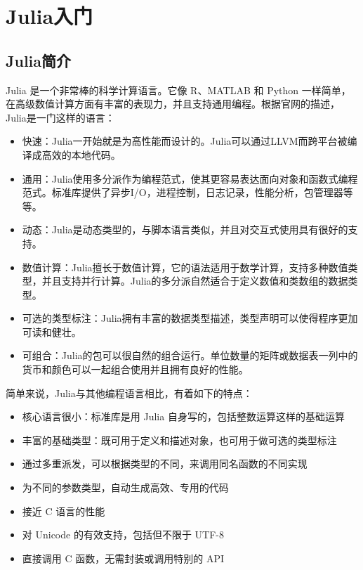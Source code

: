 \chapter{Julia入门}\label{ch1}

\section{Julia简介}\label{sec1-1}

Julia 是一个非常棒的科学计算语言。它像 R、MATLAB 和 Python 一样简单，在高级数值计算方面有丰富的表现力，并且支持通用编程。根据官网的描述，Julia是一门这样的语言\cite{Juliadevelopers2018}：

\begin{itemize}
    \tightlist
	\item 快速：Julia一开始就是为高性能而设计的。Julia可以通过LLVM而跨平台被编译成高效的本地代码。
	\item 通用：Julia使用多分派作为编程范式，使其更容易表达面向对象和函数式编程范式。标准库提供了异步I/O，进程控制，日志记录，性能分析，包管理器等等。
    \item 动态：Julia是动态类型的，与脚本语言类似，并且对交互式使用具有很好的支持。
    \item 数值计算：Julia擅长于数值计算，它的语法适用于数学计算，支持多种数值类型，并且支持并行计算。Julia的多分派自然适合于定义数值和类数组的数据类型。
    \item 可选的类型标注：Julia拥有丰富的数据类型描述，类型声明可以使得程序更加可读和健壮。
    \item 可组合：Julia的包可以很自然的组合运行。单位数量的矩阵或数据表一列中的货币和颜色可以一起组合使用并且拥有良好的性能。
\end{itemize}

简单来说，Julia与其他编程语言相比，有着如下的特点\cite{Julia2023}：

\begin{itemize}
    \tightlist
    \item 核心语言很小：标准库是用 Julia 自身写的，包括整数运算这样的基础运算
    \item 丰富的基础类型：既可用于定义和描述对象，也可用于做可选的类型标注
    \item 通过多重派发，可以根据类型的不同，来调用同名函数的不同实现
    \item 为不同的参数类型，自动生成高效、专用的代码
    \item 接近 C 语言的性能
    \item 对 Unicode 的有效支持，包括但不限于 UTF-8
    \item 直接调用 C 函数，无需封装或调用特别的 API
\end{itemize}

